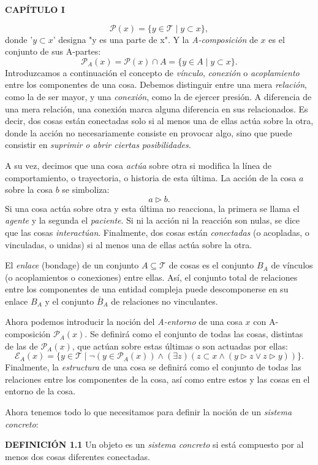\newpage
\fancyhf{}
\fancyhead[l]{\thepage} 

\begin{center}
{\fontsize{13}{16}\selectfont \textbf{CAPÍTULO I}}
\end{center}

\vspace{1cm}

{\fontsize{13}{15}\selectfont
$$ \mathcal{P}(x) = \{y \in \mathcal{T} \mid y \subset x\}, $$
donde '$y \subset x$' designa "y es una parte de x". Y la \textit{A-composición} de $x$ es el conjunto de sus A-partes:
$$ \mathcal{P}_A(x) = \mathcal{P}(x) \cap A = \{y \in A \mid y \subset x\}. $$
Introduzcamos a continuación el concepto de \textit{vínculo}, \textit{conexión} o \textit{acoplamiento} entre los componentes de una cosa. Debemos distinguir entre una mera \textit{relación}, como la de ser mayor, y una \textit{conexión}, como la de ejercer presión. A diferencia de una mera relación, una conexión marca alguna diferencia en sus relacionados. Es decir, dos cosas están conectadas solo si al menos una de ellas actúa sobre la otra, donde la acción no necesariamente consiste en provocar algo, sino que puede consistir en \textit{suprimir o abrir ciertas posibilidades}.

A su vez, decimos que una cosa \textit{actúa} sobre otra si modifica la línea de comportamiento, o trayectoria, o historia de esta última. La acción de la cosa $a$ sobre la cosa $b$ se simboliza:
$$ a \triangleright b. $$
Si una cosa actúa sobre otra y esta última no reacciona, la primera se llama el \textit{agente} y la segunda el \textit{paciente}. Si ni la acción ni la reacción son nulas, se dice que las cosas \textit{interactúan}. Finalmente, dos cosas están \textit{conectadas} (o acopladas, o vinculadas, o unidas) si al menos una de ellas actúa sobre la otra.

El \textit{enlace} (bondage) de un conjunto $A \subseteq \mathcal{T}$ de cosas es el conjunto $B_A$ de vínculos (o acoplamientos o conexiones) entre ellas. Así, el conjunto total de relaciones entre los componentes de una entidad compleja puede descomponerse en su enlace $B_A$ y el conjunto $\bar{B}_A$ de relaciones no vinculantes.

Ahora podemos introducir la noción del \textit{A-entorno} de una cosa $x$ con A-composición $\mathcal{P}_A(x)$. Se definirá como el conjunto de todas las cosas, distintas de las de $\mathcal{P}_A(x)$, que actúan sobre estas últimas o son actuadas por ellas:
$$ \mathcal{E}_A(x) = \{y \in \mathcal{T} \mid \neg (y \in \mathcal{P}_A(x)) \land (\exists z)(z \subset x \land (y \triangleright z \lor z \triangleright y))\}. $$
Finalmente, la \textit{estructura} de una cosa se definirá como el conjunto de todas las relaciones entre los componentes de la cosa, así como entre estos y las cosas en el entorno de la cosa.

Ahora tenemos todo lo que necesitamos para definir la noción de un \textit{sistema concreto}:

\textbf{DEFINICIÓN 1.1} Un objeto es un \textit{sistema concreto} si está compuesto por al menos dos cosas diferentes conectadas.
}


